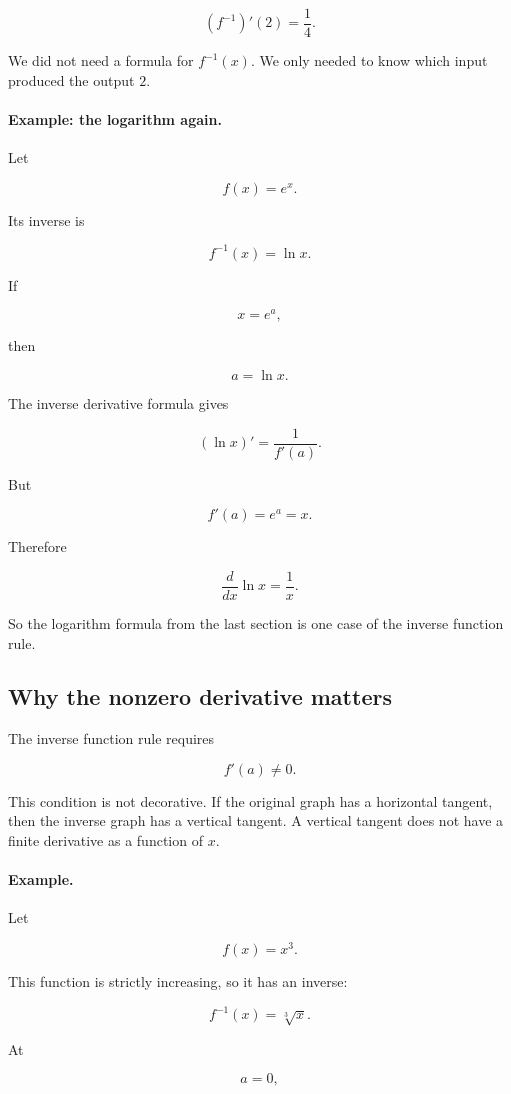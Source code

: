 \[
\boxed{
(f^{-1})'(2)=\frac14.
}
\]

We did not need a formula for \(f^{-1}(x)\).  We only needed to know which input produced the output \(2\).

\paragraph{Example: the logarithm again.}
Let

\[
f(x)=e^x.
\]

Its inverse is

\[
f^{-1}(x)=\ln x.
\]

If

\[
x=e^a,
\]

then

\[
a=\ln x.
\]

The inverse derivative formula gives

\[
(\ln x)'=\frac1{f'(a)}.
\]

But

\[
f'(a)=e^a=x.
\]

Therefore

\[
\boxed{
\frac{d}{dx}\ln x=\frac1x.
}
\]

So the logarithm formula from the last section is one case of the inverse function rule.

\subsection{Why the nonzero derivative matters}
\label{subsec:why-nonzero-derivative-inverse}

The inverse function rule requires

\[
f'(a)\neq0.
\]

This condition is not decorative.  If the original graph has a horizontal tangent, then the inverse graph has a vertical tangent.  A vertical tangent does not have a finite derivative as a function of \(x\).

\paragraph{Example.}
Let

\[
f(x)=x^3.
\]

This function is strictly increasing, so it has an inverse:

\[
f^{-1}(x)=\sqrt[3]{x}.
\]

At

\[
a=0,
\]

